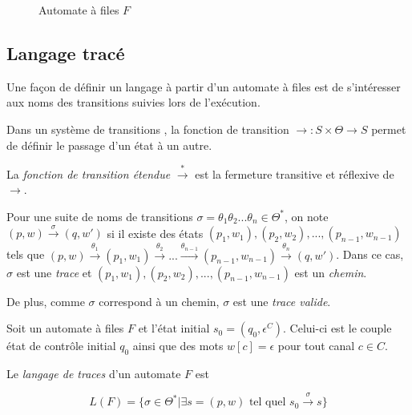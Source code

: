 \begin{example}
\begin{figure}[H]
    \caption{Automate à files $F$}\label{fig:st}
  \end{figure}


\end{example}




\subsection{Langage tracé}\label{ss:trace}

Une façon de définir un langage à partir d'un automate à files est de s'intéresser aux noms des transitions suivies lors de l'exécution.

Dans un système de transitions \tsys, la fonction de transition $\rightarrow:S\times\Theta\rightarrow S$ permet de définir le passage d'un état à un autre.

La \emph{fonction de transition étendue} $\xrightarrow{*}$ est la fermeture transitive et réflexive de $\rightarrow$.

Pour une suite de noms de transitions $\sigma=\theta_1\theta_2 ...\theta_n\in\Theta^*$, on note $(p,w)\xrightarrow{\sigma}(q,w')$ si il existe des états $(p_1,w_1),(p_2,w_2),...,(p_{n-1},w_{n-1})$ tels que $(p,w)\xrightarrow{\theta_1}(p_1,w_1)\xrightarrow{\theta_2}...\xrightarrow{\theta_{n-1}}(p_{n-1},w_{n-1})\xrightarrow{\theta_n}(q,w')$. Dans ce cas, $\sigma$ est une \emph{trace} et $(p_1,w_1),(p_2,w_2),...,(p_{n-1},w_{n-1})$ est un \emph{chemin}.

De plus, comme $\sigma$ correspond à un chemin, $\sigma$ est une \emph{trace valide}.


\begin{definition} Soit un automate à files $F$ et l'état initial $s_0=(q_0, \epsilon^C)$. Celui-ci est le couple état de contrôle initial $q_0$ ainsi que des mots $w[c]=\epsilon$ pour tout canal $c\in C$.

  Le \emph{langage de traces} d'un automate $F$ est

  $$
  L(F)=\{\sigma\in\Theta^*|\exists s=(p,w) \text{ tel quel } s_0\xrightarrow{\sigma}s\}
  $$
\end{definition}

